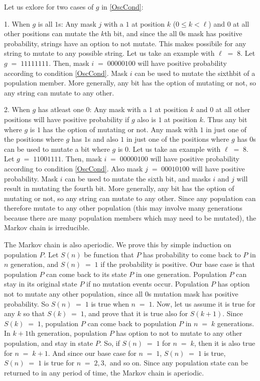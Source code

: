 Let us exlore for two cases of $g$ in \ref{OscCond}:

1. When $g$ is all $1$s:\newline
Any mask $j$ with a $1$ at position $k$ ($0 \leq k < \ell$) and $0$ at all other positions can mutate the $k$th bit, and since the 
all $0$s mask has positive probability, strings have an option to not mutate. This makes possibile for any string to mutate to 
any possible string. Let us take an example with $\ell \;=\; 8$. Let $g \;=\; 11111111$. Then, mask 
$i \;=\; 00000100$ will have positive probability according to condition \ref{OscCond}. 
Mask $i$ can be used to mutate the sixthbit of a population member. More generally, 
any bit has the option of mutating or not, so any string can mutate to any other.

2. When $g$ has atleast one $0$:\newline
Any mask with a $1$ at position $k$ and $0$ at all other positions  
will have positive probability if $g$ also is $1$ at position $k$. Thus any bit where $g$ is $1$ has the option of mutating or not.  
Any mask with $1$ in just one of the positions where $g$ has $1$s and also $1$ in just one of the positions where $g$ has $0$s can be used to 
mutate a bit where $g$ is $0$. Let us take an example with $\ell \;=\; 8$. Let $g \;=\; 11001111$. Then, 
mask $i \;=\; 00000100$ will have positive probability according to condition \ref{OscCond}. Also mask 
$j \;=\; 00010100$ will have positive probability. Mask $i$ can be used to mutate the sixth bit, and masks $i$ and $j$ will result in mutating
the fourth bit. More generally, any bit has the option of mutating or not, so any string can mutate to any other. Since any population can therefore 
mutate to any other population (this may involve many generations because there are many population members which may need to be mutated), the Markov 
chain is irreducible.

The Markov chain is also aperiodic. We prove this by simple induction on population $P$. 
Let $S(n)$ be function that $P$ has probability to come back to $P$ in $n$ generation, 
and $S(n) \;=\; 1$ if the probability is positive. 
Our base case is that population $P$ can come back to its state $P$ in one generation. 
Population $P$ can stay in its original state $P$ if no mutation events occur. 
Population $P$ has option not to mutate any other population, since all $0$s mutation mask 
has positive probability. So $S(n) \;=\; 1$ is true when $n \;=\; 1$. Now, let us assume it is true for any $k$ so that $S(k) \;=\; 1$, 
and prove that it is true also for $S(k+1)$. Since $S(k) \;=\; 1$, population $P$ can come back to population $P$ in $n \;= \;k$ generations. 
In $k+1$th generation, population $P$ has option to not to mutate to any other population, and stay in state $P$. So, if $S(n) \;=\; 1$ for 
$n \;=\; k$, then it is also true for $n \;=\; k+1$. And since our base case for $n \;=\; 1$, $S(n) \;=\; 1$ is true, 
$S(n) \;=\; 1$ is true for $n \;=\; 2, 3, $ and so on. 
Since any population state can be returned to in any period of time, the Markov chain is aperiodic. 

